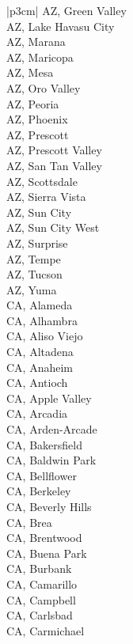 \begin{customLongTable}{ |p{3cm}| }
AZ, Green Valley \\ \hline
AZ, Lake Havasu City \\ \hline
AZ, Marana \\ \hline
AZ, Maricopa \\ \hline
AZ, Mesa \\ \hline
AZ, Oro Valley \\ \hline
AZ, Peoria \\ \hline
AZ, Phoenix \\ \hline
AZ, Prescott \\ \hline
AZ, Prescott Valley \\ \hline
AZ, San Tan Valley \\ \hline
AZ, Scottsdale \\ \hline
AZ, Sierra Vista \\ \hline
AZ, Sun City \\ \hline
AZ, Sun City West \\ \hline
AZ, Surprise \\ \hline
AZ, Tempe \\ \hline
AZ, Tucson \\ \hline
AZ, Yuma \\ \hline
CA, Alameda \\ \hline
CA, Alhambra \\ \hline
CA, Aliso Viejo \\ \hline
CA, Altadena \\ \hline
CA, Anaheim \\ \hline
CA, Antioch \\ \hline
CA, Apple Valley \\ \hline
CA, Arcadia \\ \hline
CA, Arden-Arcade \\ \hline
CA, Bakersfield \\ \hline
CA, Baldwin Park \\ \hline
CA, Bellflower \\ \hline
CA, Berkeley \\ \hline
CA, Beverly Hills \\ \hline
CA, Brea \\ \hline
CA, Brentwood \\ \hline
CA, Buena Park \\ \hline
CA, Burbank \\ \hline
CA, Camarillo \\ \hline
CA, Campbell \\ \hline
CA, Carlsbad \\ \hline
CA, Carmichael \\ \hline

\end{customLongTable}
